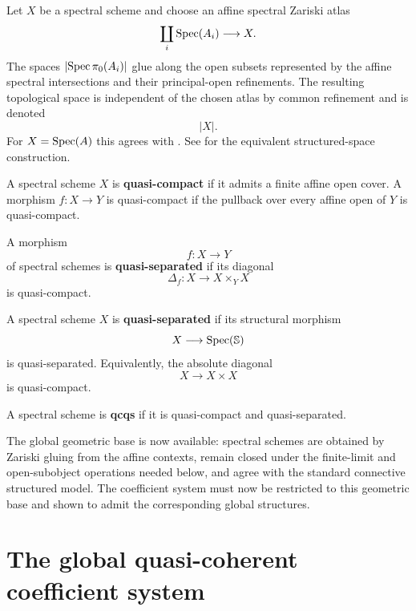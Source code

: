 \begin{definition}
\label{def:underlying-space-spectral-scheme}
Let \(X\) be a spectral scheme and choose an affine spectral Zariski atlas
\[
    \coprod_i\operatorname{Spec}(A_i)\longrightarrow X.
\]
The spaces \(\lvert\operatorname{Spec}\pi_0(A_i)\rvert\) glue along the open subsets
represented by the affine spectral intersections and their principal-open
refinements. The resulting topological space is independent of the chosen
atlas by common refinement and is denoted
\[
    |X|.
\]
For \(X=\operatorname{Spec}(A)\) this agrees with
. See
\cite{LurieSAG} for the equivalent structured-space construction.
\end{definition}

\begin{definition}
\label{def:quasi-compact-spectral-scheme}
A spectral scheme $X$ is \textbf{quasi-compact} if it admits a finite
affine open cover. A morphism $f:X\to Y$ is quasi-compact if the pullback
over every affine open of $Y$ is quasi-compact.
\end{definition}

\begin{definition}
\label{def:quasi-separated-spectral-scheme}
A morphism
\[
    f
    \colon
    X
    \longrightarrow
    Y
\]
of spectral schemes is \textbf{quasi-separated} if its diagonal
\[
    \Delta_f
    \colon
    X
    \longrightarrow
    X\times_YX
\]
is quasi-compact.

A spectral scheme $X$ is \textbf{quasi-separated} if its structural
morphism
\[
    X
    \longrightarrow
    \operatorname{Spec}(\mathbb S)
\]
is quasi-separated. Equivalently, the absolute diagonal
\[
    X
    \longrightarrow
    X\times X
\]
is quasi-compact.

A spectral scheme is \textbf{qcqs} if it is quasi-compact and
quasi-separated.
\end{definition}

The global geometric base is now available: spectral schemes are obtained by
Zariski gluing from the affine contexts, remain closed under the finite-limit
and open-subobject operations needed below, and agree with the standard
connective structured model. The coefficient system must now be restricted to
this geometric base and shown to admit the corresponding global structures.

\section{The global quasi-coherent coefficient system}
\label{sec:qcoh-spectral-schemes-relative-spec}

